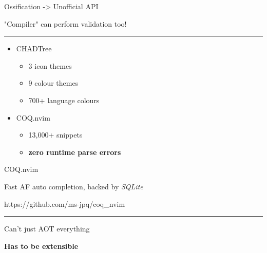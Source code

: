 \documentclass{beamer}
\begin{document}
\begin{frame}{Ossification -> Unofficial API}

	"Compiler" can perform validation too!

	\rule{\textwidth}{0.1em}

	\begin{itemize}

		\item CHADTree

		      \begin{itemize}

			      \item 3 icon themes

			      \item 9 colour themes

			      \item 700+ language colours

		      \end{itemize}

		\item COQ.nvim

		      \begin{itemize}

			      \item 13,000+ snippets

			      \item \textbf{zero runtime parse errors}

		      \end{itemize}

	\end{itemize}

\end{frame}


\begin{frame}{COQ.nvim}

	Fast AF auto completion, backed by \textit{SQLite}

	https://github.com/ms-jpq/coq\_nvim

	\rule{\textwidth}{0.1em}

	Can't just AOT everything

	\textbf{Has to be extensible}

\end{frame}
\end{document}
